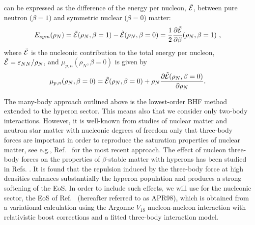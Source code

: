 can be expressed as the difference of the energy per nucleon, $\tilde{\cal E}$,
between pure neutron
($\beta=1$) and symmetric nuclear ($\beta=0$) matter:
\begin{equation}
E_{sym}(\rho_N)=\tilde{\cal E}(\rho_N,\beta=1)-\tilde{\cal
E}(\rho_N,\beta=0)=\frac{1}{2}\frac{\partial
\tilde{\cal
E}}{\partial \beta}(\rho_N, \beta=1) \ ,
\end{equation}
where $\tilde{\cal E}$ is the nucleonic contribution to the total
energy per nucleon, $ \tilde{\cal E} = \varepsilon_{NN}/\rho_N$, and
$\mu_{p,n}(\rho_N,\beta=0)$ is given by
\begin{equation}
\mu_{p,n}(\rho_N,\beta=0)=\tilde{\cal E}(\rho_N,\beta=0)+
\rho_N\frac{\partial \tilde{\cal
E}(\rho_N,\beta=0)}{\partial \rho_N}.
\end{equation}



The many-body approach outlined above is the lowest-order
BHF method extended to the hyperon sector.
This means also that we consider only
two-body interactions. However, it is well-known from studies of nuclear
matter and neutron star matter with nucleonic degrees of freedom only
that three-body forces are important in 
order to reproduce the saturation 
properties of nuclear matter, see e.g., Ref.\ \cite{apr98} for the most 
recent
approach.  
The effect of nucleon three-body forces on the properties of
$\beta$-stable matter with hyperons has been studied in 
Refs. \cite{bbs98,bbs00}. It is found that the repulsion induced
by the three-body force at high densities enhances
substantially the hyperon population and produces a strong
softening of the EoS.
In order to include such effects, we will use for the nucleonic sector,
the EoS of Ref.\ \cite{apr98} (hereafter referred to as APR98), which is
obtained from a variational calculation using the Argonne $V_{18}$
nucleon-nucleon interaction \cite{v18} with relativistic boost corrections
and a fitted three-body interaction model. 

